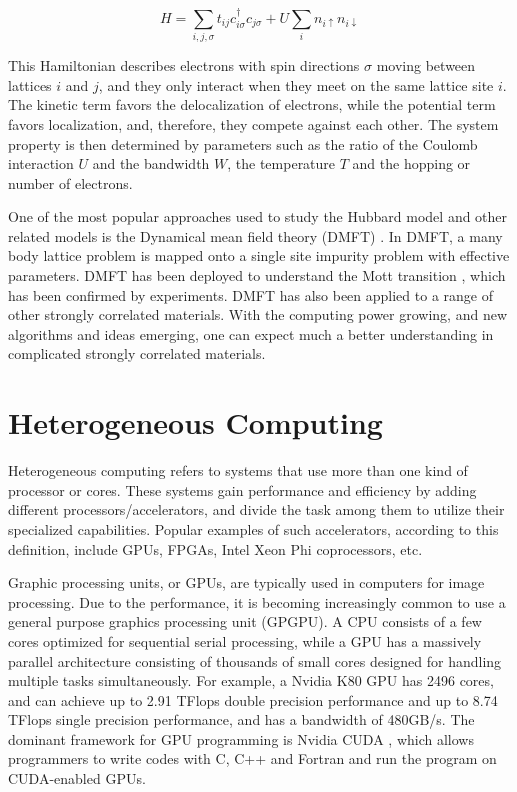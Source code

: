 \begin{equation}
  \label{eq:13}
  H=\sum_{i,j,\sigma}t_{ij}c_{i\sigma}^\dagger c_{j\sigma} + U\sum_i n_{i\uparrow} n_{i\downarrow}
\end{equation}

This Hamiltonian describes electrons with spin directions $\sigma$ moving between 
lattices $i$ and $j$, and they only interact when they meet on the same lattice 
site $i$. The kinetic term favors the delocalization of electrons, while the 
potential term favors localization, and, therefore, they compete against each
other. The system property is then determined by parameters such as the ratio of
the Coulomb interaction $U$ and the bandwidth $W$, the temperature $T$ and the 
hopping or number of electrons. 

One of the most popular approaches used to study the Hubbard model and other related
models is the Dynamical mean field theory (DMFT)
\cite{PhysRevB.45.6479,PhysRevLett.69.168,RevModPhys.68.13,PhysRevLett.69.1236,PhysRevLett.69.1240}. 
In DMFT, a many body lattice
problem is mapped onto a single site impurity problem with effective parameters.
DMFT has been deployed to understand the Mott transition 
\cite{PhysRevLett.69.1796,PhysRevLett.70.1666,PhysRevB.48.7167},
which has been confirmed
by experiments\cite{PhysRevLett.75.105,PhysRevB.58.3690,PhysRevLett.90.186403}. 
DMFT has also been applied to a range of other strongly correlated 
materials. With the computing power growing, and new algorithms and ideas emerging, 
one can expect much a better understanding in complicated strongly correlated 
materials.

\section{Heterogeneous Computing}
Heterogeneous computing refers to systems that use more than one kind of 
processor or cores. These systems gain performance and efficiency by adding
different processors/accelerators, and divide the task among them to utilize 
their specialized capabilities. 
Popular examples of such accelerators, according to this definition, include 
GPUs, FPGAs, Intel Xeon Phi coprocessors, etc.


Graphic processing units, or GPUs, are typically used in computers for image 
processing. 
Due to the performance, it is becoming increasingly common to use a general purpose 
graphics processing unit (GPGPU).
A CPU consists of a few cores optimized for sequential serial processing,
while a GPU has a massively parallel architecture 
consisting of thousands of small cores designed for handling multiple tasks 
simultaneously.
For example, a Nvidia K80 GPU \cite{nv_k80_spec} has 2496 cores, and can achieve up to 2.91 TFlops 
double precision performance and up to 8.74 TFlops single precision performance, 
and has a bandwidth of 480GB/s.
The dominant framework for GPU programming is Nvidia CUDA \cite{Nickolls:2008:SPP:1365490.1365500}, which allows 
programmers to write codes with C, C++ and Fortran and run the program on CUDA-enabled 
GPUs.


